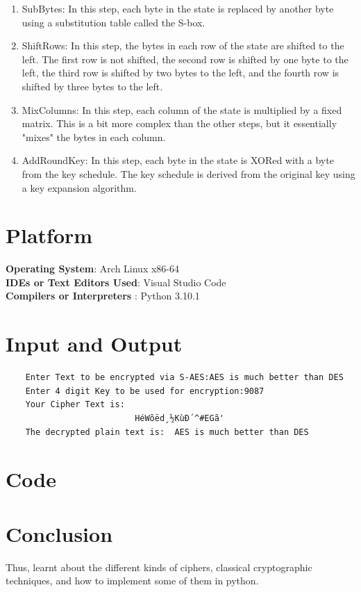 \documentclass[openany]{book}
\begin{document}
\begin{enumerate}
	\item SubBytes: In this step, each byte in the state is replaced by another byte using a substitution table called the S-box.

	\item ShiftRows: In this step, the bytes in each row of the state are shifted to the left. The first row is not shifted, the second row is shifted by one byte to the left, the third row is shifted by two bytes to the left, and the fourth row is shifted by three bytes to the left.

	\item MixColumns: In this step, each column of the state is multiplied by a fixed matrix. This is a bit more complex than the other steps, but it essentially "mixes" the bytes in each column.

	\item AddRoundKey: In this step, each byte in the state is XORed with a byte from the key schedule. The key schedule is derived from the original key using a key expansion algorithm.
\end{enumerate}

\section{Platform}
\textbf{Operating System}: Arch Linux x86-64 \\
\textbf{IDEs or Text Editors Used}: Visual Studio Code\\
\textbf{Compilers or Interpreters} : Python 3.10.1\\

\section{Input and Output}
\begin{verbatim}
    Enter Text to be encrypted via S-AES:AES is much better than DES
    Enter 4 digit Key to be used for encryption:9087
    Your Cipher Text is:  
                          HéWõëd¸½KùÐ´^#EGã'
    The decrypted plain text is:  AES is much better than DES
\end{verbatim}
\section{Code}


\section{Conclusion}
Thus, learnt about the different kinds of ciphers, classical cryptographic techniques, and how to implement some of them in python.
\clearpage
\end{document}
